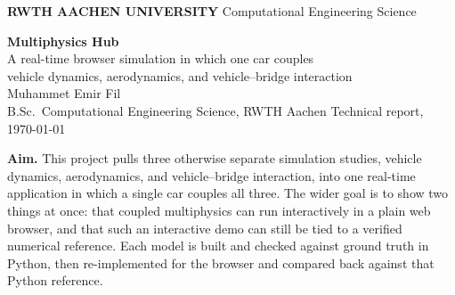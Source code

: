 \documentclass[11pt,a4paper]{article}
\newcommand{\rwthbanner}{%
  \noindent\colorbox{rwthblue}{%
    \parbox{\dimexpr\textwidth-2\fboxsep\relax}{%
      \vspace{2.5pt}%
      {\color{white}\textbf{RWTH AACHEN UNIVERSITY}}\hfill
      {\color{white}\footnotesize Computational Engineering Science}%
      \vspace{2.5pt}}}%
  \vspace{1pt}\par\noindent{\color{rule}\rule{\textwidth}{1.3pt}}%
}
\begin{document}
\rwthbanner
\vspace{0.8em}

{\raggedright
  {\LARGE\bfseries Multiphysics Hub}\\[0.35em]
  {\large A real-time browser simulation in which one car couples\\
   vehicle dynamics, aerodynamics, and vehicle--bridge interaction}\\[0.8em]
  {\normalsize Muhammet Emir Fil}\\[0.15em]
  {\small B.Sc.\ Computational Engineering Science, RWTH Aachen \quad\textbullet\quad Technical report, \today}\par
}
\vspace{0.6em}
\noindent{\color{rule}\rule{\textwidth}{0.6pt}}
\vspace{1.0em}

\noindent\colorbox{rwthblue25}{%
  \parbox{\dimexpr\textwidth-2\fboxsep\relax}{%
  \vspace{3pt}\textbf{Aim.} This project pulls three otherwise separate simulation
  studies, vehicle dynamics, aerodynamics, and vehicle--bridge interaction, into one
  real-time application in which a single car couples all three. The wider goal is to
  show two things at once: that coupled multiphysics can run interactively in a plain
  web browser, and that such an interactive demo can still be tied to a verified
  numerical reference. Each model is
  built and checked against ground truth in Python, then re-implemented for the browser
  and compared back against that Python reference.\vspace{3pt}}}

\vspace{1.0em}

\begin{abstract}
\noindent
A car is driven in real time around a user-drawn track. As it moves it couples three
physics models that are recomputed every frame, with no pre-recorded data: a double-track
(four-wheel) vehicle with Pacejka tyres and load transfer, a 2D fluid solver around the
car silhouette that returns a drag and a downforce, and a moving-load bridge beam that
deflects under the wheel force. Each model is first written in numpy and checked against
an analytical or finite-element reference, then ported to JavaScript for the browser and
compared against its numpy version on identical inputs (agreement of order $10^{-13}$ for
the vehicle and $10^{-9}\,$m for the bridge). This report describes the three models, states
which couplings are physical and which are only illustrative, and gives the verification
that backs the numbers shown live on screen.
\end{abstract}
\end{document}
